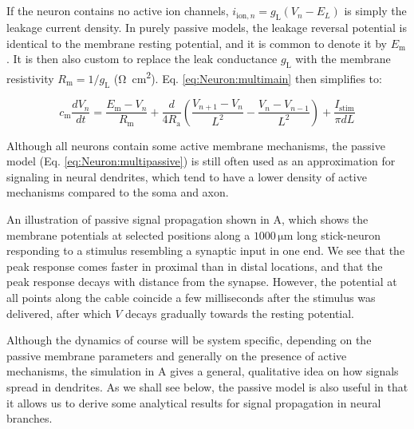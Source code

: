 \subsection{}
\label{sec:Neuron:Passive_multicomp}
If the neuron contains no active ion channels, $i_{\mathrm{ion},n} = g_\text{L}(V_n - E_L)$ is simply the leakage current density. In purely passive models, the leakage reversal potential is identical to the membrane resting potential, and it is common to denote it by $E_\text{m}$. It is then also custom to replace the leak conductance $g_\text{L}$ with the membrane resistivity $R_\text{m} = 1/g_\text{L}$ (\si{\ohm\square\centi\metre}). Eq. \ref{eq:Neuron:multimain} then simplifies to:

\begin{equation}
c_\text{m} \frac{dV_n}{dt} = \frac{E_\text{m}-V_n}{R_\text{m}} + \frac{d}{4R_\text{a}}\left(\frac{V_{n+1}-V_n}{L^2} - \frac{V_n-V_{n-1}}{L^2} \right) + \frac{I_\text{stim}}{\pi d L}
\label{eq:Neuron:multipassive}
\end{equation}

Although all neurons contain some active membrane mechanisms, the passive model (Eq. \ref{eq:Neuron:multipassive}) is still often used as an approximation for signaling in neural dendrites, which tend to have a lower density of active mechanisms compared to the soma and axon. 

An illustration of passive signal propagation shown in A, which shows the membrane potentials at selected positions along a $1000 \, \si{\micro\metre}$ long stick-neuron responding to a stimulus resembling a synaptic input in one end. We see that the peak response comes faster in proximal than in distal locations, and that the peak response decays with distance from the synapse. However, the potential at all points along the cable coincide a few milliseconds after the stimulus was delivered, after which $V$  decays gradually towards the resting potential.

Although the dynamics of course will be system specific, depending on the passive membrane parameters and generally on the presence of active mechanisms, the simulation in A gives a general, qualitative idea on how signals spread in dendrites. As we shall see below, the passive model is also useful in that it allows us to derive some analytical results for signal propagation in neural branches.

